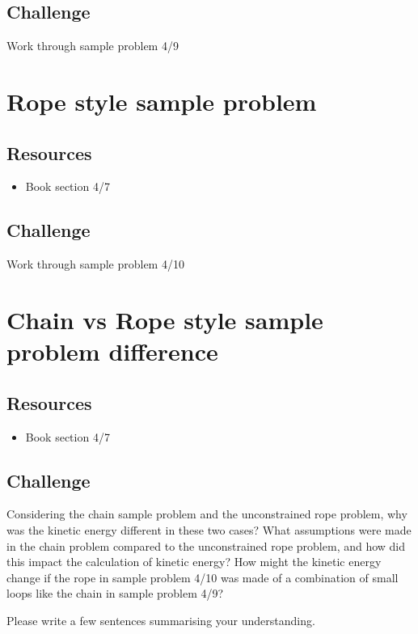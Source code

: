 \subsection*{Challenge}
Work through sample problem 4/9




\newpage
\section{Rope style sample problem}

\subsection*{Resources}
\begin{itemize}
    \item Book section 4/7
\end{itemize}

\subsection*{Challenge}
Work through sample problem 4/10




\newpage
\section{Chain vs Rope style sample problem difference}

\subsection*{Resources}
\begin{itemize}
    \item Book section 4/7
\end{itemize}

\subsection*{Challenge}
Considering the chain sample problem and the unconstrained rope problem, why was the kinetic energy different in these two cases? What assumptions were made in the chain problem compared to the unconstrained rope problem, and how did this impact the calculation of kinetic energy? How might the kinetic energy change if the rope in sample problem 4/10 was made of a combination of small loops like the chain in sample problem 4/9?

Please write a few sentences summarising your understanding.

